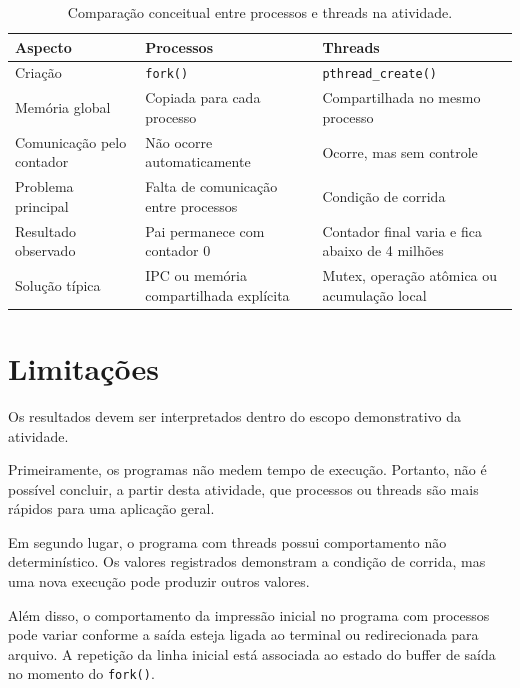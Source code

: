 \begin{table}[htbp]
    \centering
    \caption{Comparação conceitual entre processos e threads na atividade.}
    \label{tab:atvd03-comparacao}
    \begin{tabular}{p{}|p{}|p{}}
        \hline
        \textbf{Aspecto} & \textbf{Processos} & \textbf{Threads} \\
        \hline
        Criação &
        \texttt{fork()} &
        \texttt{pthread\_create()} \\
        \hline
        Memória global &
        Copiada para cada processo &
        Compartilhada no mesmo processo \\
        \hline
        Comunicação pelo contador &
        Não ocorre automaticamente &
        Ocorre, mas sem controle \\
        \hline
        Problema principal &
        Falta de comunicação entre processos &
        Condição de corrida \\
        \hline
        Resultado observado &
        Pai permanece com contador 0 &
        Contador final varia e fica abaixo de 4 milhões \\
        \hline
        Solução típica &
        IPC ou memória compartilhada explícita &
        Mutex, operação atômica ou acumulação local \\
        \hline
    \end{tabular}
\end{table}

\section{Limitações}
\label{sec:atvd03-limitacoes}

Os resultados devem ser interpretados dentro do escopo demonstrativo da atividade.

Primeiramente, os programas não medem tempo de execução. Portanto, não é possível concluir, a partir desta atividade, que processos ou threads são mais rápidos para uma aplicação geral.

Em segundo lugar, o programa com threads possui comportamento não determinístico. Os valores registrados demonstram a condição de corrida, mas uma nova execução pode produzir outros valores.

Além disso, o comportamento da impressão inicial no programa com processos pode variar conforme a saída esteja ligada ao terminal ou redirecionada para arquivo. A repetição da linha inicial está associada ao estado do buffer de saída no momento do \texttt{fork()}.

